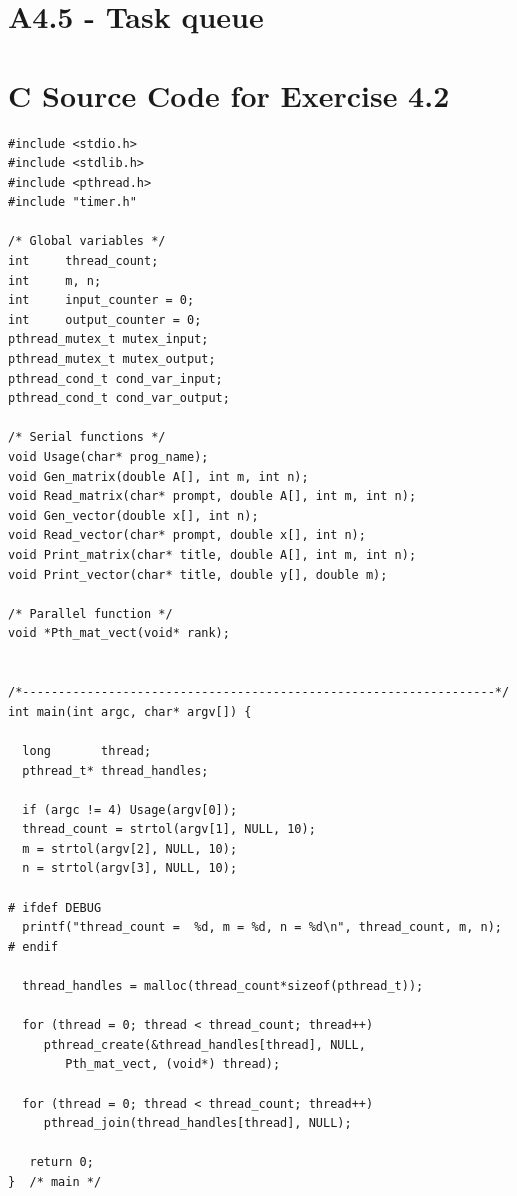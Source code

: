 \documentclass[a4paper,11pt,twoside]{article}
\begin{document}
\section{A4.5 - Task queue} 





\appendix

\section{C Source Code for Exercise 4.2}{\label{app:source4.2}
\begin{verbatim}
#include <stdio.h>
#include <stdlib.h>
#include <pthread.h>
#include "timer.h"

/* Global variables */
int     thread_count;
int     m, n;
int     input_counter = 0;
int     output_counter = 0;
pthread_mutex_t mutex_input;
pthread_mutex_t mutex_output;
pthread_cond_t cond_var_input;
pthread_cond_t cond_var_output;

/* Serial functions */
void Usage(char* prog_name);
void Gen_matrix(double A[], int m, int n);
void Read_matrix(char* prompt, double A[], int m, int n);
void Gen_vector(double x[], int n);
void Read_vector(char* prompt, double x[], int n);
void Print_matrix(char* title, double A[], int m, int n);
void Print_vector(char* title, double y[], double m);

/* Parallel function */
void *Pth_mat_vect(void* rank);


/*------------------------------------------------------------------*/
int main(int argc, char* argv[]) {
  
  long       thread;
  pthread_t* thread_handles;

  if (argc != 4) Usage(argv[0]);
  thread_count = strtol(argv[1], NULL, 10);
  m = strtol(argv[2], NULL, 10);
  n = strtol(argv[3], NULL, 10);

# ifdef DEBUG
  printf("thread_count =  %d, m = %d, n = %d\n", thread_count, m, n);
# endif

  thread_handles = malloc(thread_count*sizeof(pthread_t));

  for (thread = 0; thread < thread_count; thread++)
     pthread_create(&thread_handles[thread], NULL,
        Pth_mat_vect, (void*) thread);

  for (thread = 0; thread < thread_count; thread++)
     pthread_join(thread_handles[thread], NULL);
  
   return 0;
}  /* main */



\end{verbatim}}
\end{document}
